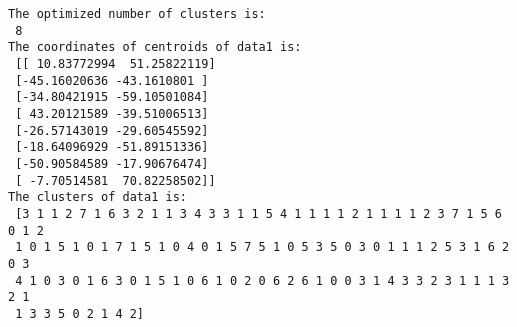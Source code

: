 \documentclass[11pt]{article}
\begin{document}
    \begin{Verbatim}[commandchars=\\\{\}]
The optimized number of clusters is:
 8
The coordinates of centroids of data1 is:
 [[ 10.83772994  51.25822119]
 [-45.16020636 -43.1610801 ]
 [-34.80421915 -59.10501084]
 [ 43.20121589 -39.51006513]
 [-26.57143019 -29.60545592]
 [-18.64096929 -51.89151336]
 [-50.90584589 -17.90676474]
 [ -7.70514581  70.82258502]]
The clusters of data1 is:
 [3 1 1 2 7 1 6 3 2 1 1 3 4 3 3 1 1 5 4 1 1 1 1 2 1 1 1 1 2 3 7 1 5 6 0 1 2
 1 0 1 5 1 0 1 7 1 5 1 0 4 0 1 5 7 5 1 0 5 3 5 0 3 0 1 1 1 2 5 3 1 6 2 0 3
 4 1 0 3 0 1 6 3 0 1 5 1 0 6 1 0 2 0 6 2 6 1 0 0 3 1 4 3 3 2 3 1 1 1 3 2 1
 1 3 3 5 0 2 1 4 2]




    \end{Verbatim}
\end{document}
